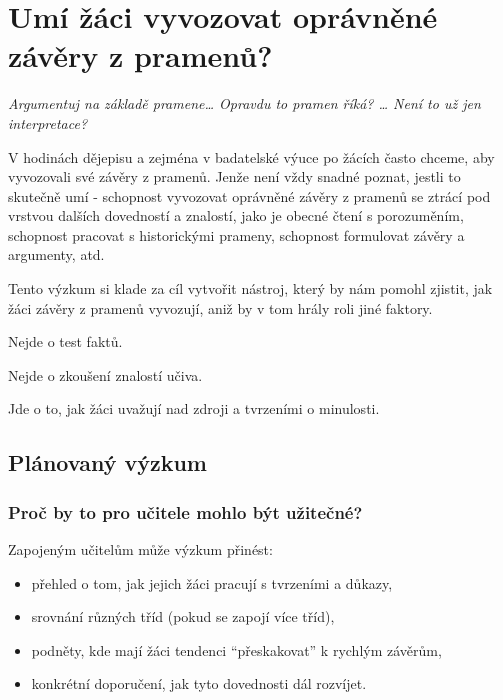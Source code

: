 \documentclass[
  12pt,
  english,
  a4paper,
  extrafontsizes,onecolumn,openright
  ]{memoir}
\providecommand{\tightlist}{%
  \setlength{\itemsep}{0pt}\setlength{\parskip}{0pt}}
\begin{document}
\chapter{Umí žáci vyvozovat oprávněné závěry z pramenů?}\label{umuxed-ux17euxe1ci-vyvozovat-opruxe1vnux11bnuxe9-zuxe1vux11bry-z-pramenux16f}

\emph{Argumentuj na základě pramene\ldots{} Opravdu to pramen říká? \ldots{} Není to
už jen interpretace?}

V hodinách dějepisu a zejména v badatelské výuce po žácích často
chceme, aby vyvozovali své závěry z pramenů. Jenže není vždy snadné
poznat, jestli to skutečně umí - schopnost vyvozovat oprávněné závěry z
pramenů se ztrácí pod vrstvou dalších dovedností a znalostí, jako je
obecné čtení s porozuměním, schopnost pracovat s historickými prameny,
schopnost formulovat závěry a argumenty, atd.

Tento výzkum si klade za cíl vytvořit nástroj, který by nám pomohl
zjistit, jak žáci závěry z pramenů vyvozují, aniž by v tom hrály roli
jiné faktory.

Nejde o test faktů.

Nejde o zkoušení znalostí učiva.

Jde o to, jak žáci uvažují nad zdroji a tvrzeními o minulosti.

\section{Plánovaný výzkum}\label{pluxe1novanuxfd-vuxfdzkum-1}

\subsection{Proč by to pro učitele mohlo být užitečné?}\label{proux10d-by-to-pro-uux10ditele-mohlo-buxfdt-uux17eiteux10dnuxe9}

Zapojeným učitelům může výzkum přinést:

\begin{itemize}
\tightlist
\item
  přehled o tom, jak jejich žáci pracují s tvrzeními a důkazy,
\item
  srovnání různých tříd (pokud se zapojí více tříd),
\item
  podněty, kde mají žáci tendenci \enquote{přeskakovat} k rychlým závěrům,
\item
  konkrétní doporučení, jak tyto dovednosti dál rozvíjet.
\end{itemize}
\end{document}
